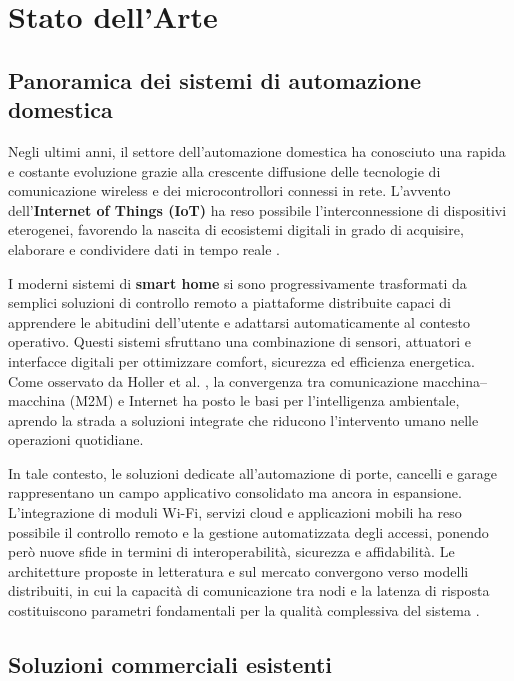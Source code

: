 \chapter{Stato dell'Arte}

\section{Panoramica dei sistemi di automazione domestica}

Negli ultimi anni, il settore dell’automazione domestica ha conosciuto una rapida e costante evoluzione grazie alla crescente diffusione delle tecnologie di comunicazione wireless e dei microcontrollori connessi in rete.  
L’avvento dell’\textbf{Internet of Things (IoT)} ha reso possibile l’interconnessione di dispositivi eterogenei, favorendo la nascita di ecosistemi digitali in grado di acquisire, elaborare e condividere dati in tempo reale \cite{Atzori2010, Gubbi2013}.  

I moderni sistemi di \textbf{smart home} si sono progressivamente trasformati da semplici soluzioni di controllo remoto a piattaforme distribuite capaci di apprendere le abitudini dell’utente e adattarsi automaticamente al contesto operativo.  
Questi sistemi sfruttano una combinazione di sensori, attuatori e interfacce digitali per ottimizzare comfort, sicurezza ed efficienza energetica.  
Come osservato da Holler et al. \cite{Holler2014}, la convergenza tra comunicazione macchina–macchina (M2M) e Internet ha posto le basi per l’intelligenza ambientale, aprendo la strada a soluzioni integrate che riducono l’intervento umano nelle operazioni quotidiane.

In tale contesto, le soluzioni dedicate all’automazione di porte, cancelli e garage rappresentano un campo applicativo consolidato ma ancora in espansione.  
L’integrazione di moduli Wi-Fi, servizi cloud e applicazioni mobili ha reso possibile il controllo remoto e la gestione automatizzata degli accessi, ponendo però nuove sfide in termini di interoperabilità, sicurezza e affidabilità.  
Le architetture proposte in letteratura e sul mercato convergono verso modelli distribuiti, in cui la capacità di comunicazione tra nodi e la latenza di risposta costituiscono parametri fondamentali per la qualità complessiva del sistema \cite{Palattella2016, Piyare2013}.

\section{Soluzioni commerciali esistenti}

